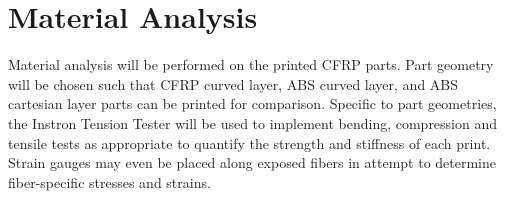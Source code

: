 \section{Material Analysis}

\indent

Material analysis will be performed on the printed CFRP parts. Part geometry will be chosen such that CFRP curved layer, ABS curved layer, and ABS cartesian layer parts can be printed for comparison. Specific to part geometries, the Instron Tension Tester will be used to implement bending, compression and tensile tests as appropriate to quantify the strength and stiffness of each print. Strain gauges may even be placed along exposed fibers in attempt to determine fiber-specific stresses and strains.\\